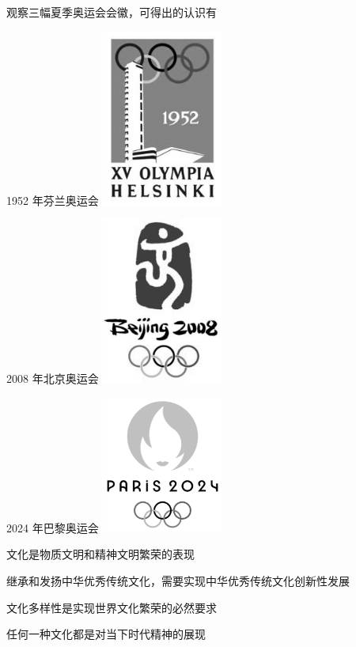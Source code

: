 \documentclass{exam-zh}
\begin{document}
\begin{question}
  观察三幅夏季奥运会会徽，可得出的认识有

  \begin{multifigures}
    \item[\CJKfamily{zhkai} 1952 年芬兰奥运会] \includegraphics[width=4cm]{helsinki.png}
    \item[\CJKfamily{zhkai} 2008 年北京奥运会] \includegraphics[width=4cm]{beijing.png}
    \item[\CJKfamily{zhkai} 2024 年巴黎奥运会] \includegraphics[width=4cm]{paris.png}
  \end{multifigures}

   文化是物质文明和精神文明繁荣的表现

   继承和发扬中华优秀传统文化，需要实现中华优秀传统文化创新性发展

   文化多样性是实现世界文化繁荣的必然要求

   任何一种文化都是对当下时代精神的展现

  \begin{choices}
  \item {}
  \item {}
  \item {}
  \item {}
  \end{choices}
\end{question}
\end{document}
